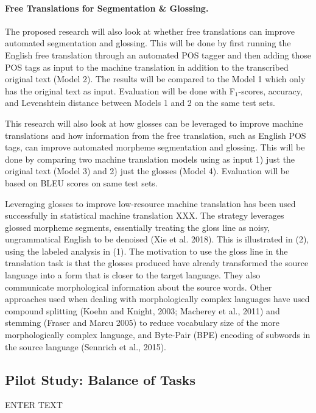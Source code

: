 \paragraph{Free Translations for Segmentation \& Glossing.}
The proposed research will also look at whether free translations can improve automated segmentation and glossing. This will be done by first running the English free translation through an automated POS tagger and then adding those POS tags as input to the machine translation in addition to the transcribed original text (Model 2). The results will be compared to the Model 1 which only has the original text as input. Evaluation will be done with F$_1$-scores, accuracy, and Levenshtein distance between Models 1 and 2 on the same test sets. %

This research will also look at how glosses can be leveraged to improve machine translations and how information from the free translation, such as English POS tags, can improve automated morpheme segmentation and glossing. This will be done by comparing two machine translation models using as input 1) just the original text (Model 3) and 2) just the glosses (Model 4). Evaluation will be based on BLEU scores on same test sets. %

Leveraging glosses to improve low-resource machine translation has been used successfully in statistical machine translation XXX. The strategy leverages glossed morpheme segments, essentially treating the gloss line as noisy, ungrammatical English to be denoised (Xie et al. 2018). This is illustrated in (2), using the labeled analysis in (1). The motivation to use the gloss line in the translation task is that the glosses produced have already transformed the source language into a form that is closer to the target language. They also communicate morphological information about the source words. Other approaches used when dealing with morphologically complex languages have used compound splitting (Koehn and Knight, 2003; Macherey et al., 2011) and stemming (Fraser and Marcu 2005) to reduce vocabulary size of the more morphologically complex language, and Byte-Pair (BPE) encoding of subwords in the source language (Sennrich et al., 2015). 

\subsection{Pilot Study: Balance of Tasks}

ENTER TEXT
